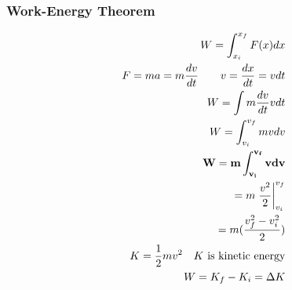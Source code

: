 \documentclass[12pt]{article}
\theoremstyle{break}
\numberwithin{theorem}{subsection}
\numberwithin{lemma}{subsection}
\numberwithin{corollary}{subsection}
\numberwithin{equation}{subsection}
\begin{document}
\subsubsection{Work-Energy Theorem}
\begin{align*}
W = \int_{x_i}^{x_f} F(x) dx \\
F = ma = m \frac{dv}{dt} \qquad v = \frac{dx}{dt} = vdt \\
W = \int m \frac{dv}{dt} v dt \\
W = \int_{v_i}^{v_f} m v dv  \\
{\bf W = m \int_{v_i}^{v_f} v dv} \\
= m \left. \frac{v^2}{2} \right|_{v_i}^{v_f} \\
= m (\frac{v_f^2 - v_i^2}{2}) \\
K = \frac12 mv^2 \quad \text{$K$ is kinetic energy} \\
W = K_f - K_i = \Delta K
\end{align*}
\end{document}
